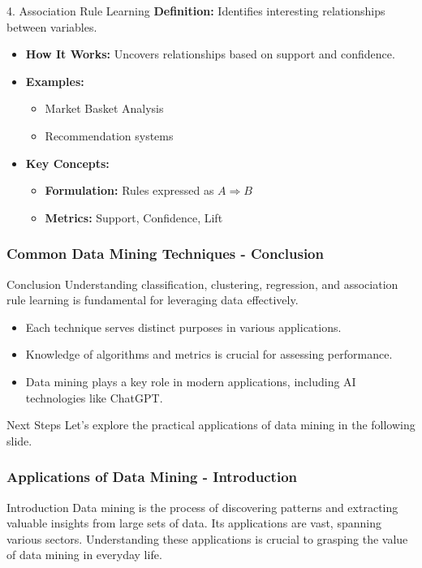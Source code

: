 \documentclass[aspectratio=169]{beamer}
\begin{document}
\begin{frame}[fragile]
    \begin{block}{4. Association Rule Learning}
        \textbf{Definition:} Identifies interesting relationships between variables.
    \end{block}
    \begin{itemize}
        \item \textbf{How It Works:} Uncovers relationships based on support and confidence.
        \item \textbf{Examples:}
        \begin{itemize}
            \item Market Basket Analysis
            \item Recommendation systems
        \end{itemize}
        \item \textbf{Key Concepts:}
        \begin{itemize}
            \item \textbf{Formulation:} Rules expressed as \( A \Rightarrow B \)
            \item \textbf{Metrics:} Support, Confidence, Lift
        \end{itemize}
    \end{itemize}
\end{frame}

\begin{frame}[fragile]
    \frametitle{Common Data Mining Techniques - Conclusion}
    \begin{block}{Conclusion}
        Understanding classification, clustering, regression, and association rule learning is fundamental for leveraging data effectively.
    \end{block}
    \begin{itemize}
        \item Each technique serves distinct purposes in various applications.
        \item Knowledge of algorithms and metrics is crucial for assessing performance.
        \item Data mining plays a key role in modern applications, including AI technologies like ChatGPT.
    \end{itemize}
    \begin{block}{Next Steps}
        Let’s explore the practical applications of data mining in the following slide.
    \end{block}
\end{frame}

\begin{frame}[fragile]
    \frametitle{Applications of Data Mining - Introduction}
    \begin{block}{Introduction}
        Data mining is the process of discovering patterns and extracting valuable insights from large sets of data. Its applications are vast, spanning various sectors. Understanding these applications is crucial to grasping the value of data mining in everyday life.
    \end{block}
\end{frame}
\end{document}
